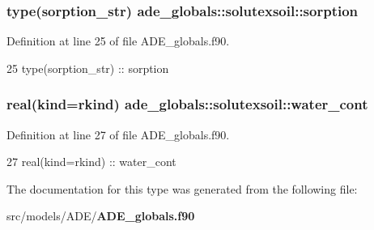 \subsubsection[{sorption}]{\setlength{\rightskip}{0pt plus 5cm}type({\bf sorption\+\_\+str}) ade\+\_\+globals\+::solutexsoil\+::sorption}\label{structade__globals_1_1solutexsoil_a0850bc9aa6cb0428777f9489d15e4d1f}


Definition at line 25 of file A\+D\+E\+\_\+globals.\+f90.


\begin{DoxyCode}
25     \textcolor{keywordtype}{type}(sorption_str) :: sorption
\end{DoxyCode}
\subsubsection[{water\+\_\+cont}]{\setlength{\rightskip}{0pt plus 5cm}real(kind=rkind) ade\+\_\+globals\+::solutexsoil\+::water\+\_\+cont}\label{structade__globals_1_1solutexsoil_a09d5ed64c87367c08b92ddce04d1abe3}


Definition at line 27 of file A\+D\+E\+\_\+globals.\+f90.


\begin{DoxyCode}
27     \textcolor{keywordtype}{real(kind=rkind)} :: water\_cont
\end{DoxyCode}


The documentation for this type was generated from the following file\+:\begin{DoxyCompactItemize}
\item 
src/models/\+A\+D\+E/{\bf A\+D\+E\+\_\+globals.\+f90}\end{DoxyCompactItemize}
